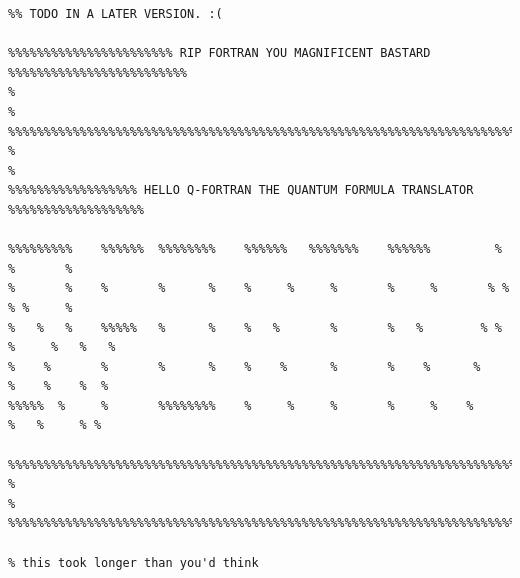 %
%


\begin{verbatim}
%% TODO IN A LATER VERSION. :(

%%%%%%%%%%%%%%%%%%%%%%% RIP FORTRAN YOU MAGNIFICENT BASTARD %%%%%%%%%%%%%%%%%%%%%%%%%
%                                                                                   %
%%%%%%%%%%%%%%%%%%%%%%%%%%%%%%%%%%%%%%%%%%%%%%%%%%%%%%%%%%%%%%%%%%%%%%%%%%%%%%%%%%%%%
%                                                                                   %
%%%%%%%%%%%%%%%%%% HELLO Q-FORTRAN THE QUANTUM FORMULA TRANSLATOR %%%%%%%%%%%%%%%%%%%

%%%%%%%%%    %%%%%%  %%%%%%%%    %%%%%%   %%%%%%%    %%%%%%         %       %       %
%       %    %       %      %    %     %     %       %     %       % %      % %     %
%   %   %    %%%%%   %      %    %   %       %       %   %        % % %     %   %   %
%    %       %       %      %    %    %      %       %    %      %     %    %    %  %
%%%%%  %     %       %%%%%%%%    %     %     %       %     %    %       %   %     % %

%%%%%%%%%%%%%%%%%%%%%%%%%%%%%%%%%%%%%%%%%%%%%%%%%%%%%%%%%%%%%%%%%%%%%%%%%%%%%%%%%%%%%
%                                                                                   %
%%%%%%%%%%%%%%%%%%%%%%%%%%%%%%%%%%%%%%%%%%%%%%%%%%%%%%%%%%%%%%%%%%%%%%%%%%%%%%%%%%%%%

% this took longer than you'd think
\end{verbatim}
